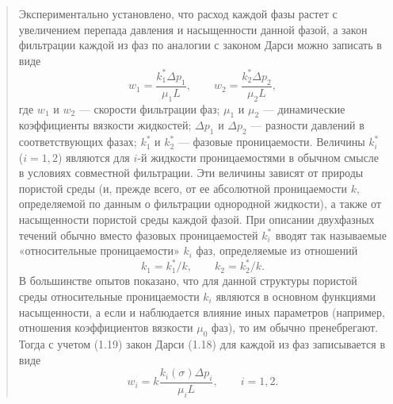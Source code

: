 \documentclass[12pt,a4paper]{article}
\begin{document}
\begin{quote}\sloppy
Экспериментально установлено, что расход каждой фазы растет с увеличением перепада давления и насыщенности данной фазой, а закон фильтрации каждой из фаз по аналогии с законом Дарси можно записать в виде
\begin{equation}w_1=\frac{k_1^*\Delta p_1}{\mu_1L},\qquad w_2=\frac{k_2^*\Delta p_2}{\mu_2L},\tag{1.18}\label{q10:eq-1-18}\end{equation}
где $w_1$ и $w_2$ --- скорости фильтрации фаз; $\mu_1$ и $\mu_2$ --- динамические коэффициенты вязкости жидкостей; $\Delta p_1$ и $\Delta p_2$ --- разности давлений в соответствующих фазах; $k_1^*$ и $k_2^*$ --- фазовые проницаемости. Величины $k_i^*$ ($i=1,2$) являются для $i$-й жидкости проницаемостями в обычном смысле в условиях совместной фильтрации. Эти величины зависят от природы пористой среды (и, прежде всего, от ее абсолютной проницаемости $k$, определяемой по данным о фильтрации однородной жидкости), а также от насыщенности пористой среды каждой фазой. При описании двухфазных течений обычно вместо фазовых проницаемостей $k_i^*$ вводят так называемые
«относительные проницаемости» $k_i$ фаз, определяемые из отношений
\begin{equation}k_1=k_1^*/k,\qquad k_2=k_2^*/k.\tag{1.19}\label{q10:eq-1-19}\end{equation}
В большинстве опытов показано, что для данной структуры пористой среды относительные проницаемости $k_i$ являются в основном функциями насыщенности, а если и наблюдается влияние иных параметров (например, отношения коэффициентов вязкости $\mu_0$ фаз), то им обычно пренебрегают. Тогда с учетом (1.19) закон Дарси (1.18) для каждой из фаз записывается в виде
\begin{equation}w_i=k\frac{k_i(\sigma)\Delta p_i}{\mu_iL},\qquad i=1,2.\tag{1.20}\label{q10:eq-1-20}\end{equation}
\par\nobreak{}\par
\end{quote}
\end{document}
